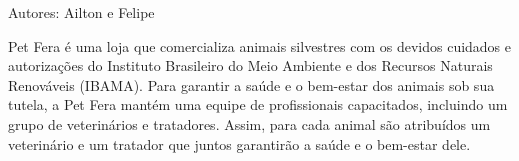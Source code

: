 Autores\+: Ailton e Felipe

Pet Fera é uma loja que comercializa animais silvestres com os devidos cuidados e autorizações do Instituto Brasileiro do Meio Ambiente e dos Recursos Naturais Renováveis (I\+B\+A\+MA). Para garantir a saúde e o bem-\/estar dos animais sob sua tutela, a Pet Fera mantém uma equipe de profissionais capacitados, incluindo um grupo de veterinários e tratadores. Assim, para cada animal são atribuídos um veterinário e um tratador que juntos garantirão a saúde e o bem-\/estar dele. 